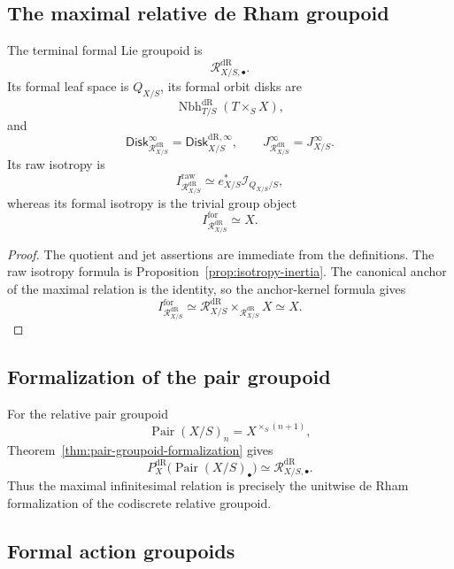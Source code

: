 \subsection{The maximal relative de Rham groupoid}

\begin{example}
The terminal formal Lie groupoid is
\[
    \mathcal R^{\mathrm{dR}}_{X/S,\bullet}.
\]
Its formal leaf space is $Q_{X/S}$, its formal orbit disks are
\[
    \operatorname{Nbh}^{\mathrm{dR}}_{T/S}(T\times_SX),
\]
and
\[
    \mathsf{Disk}^{\infty}_{\mathcal R^{\mathrm{dR}}_{X/S}}=\mathsf{Disk}^{\mathrm{dR},\infty}_{X/S},
    \qquad
    J^\infty_{\mathcal R^{\mathrm{dR}}_{X/S}}=J^\infty_{X/S}.
\]
Its raw isotropy is
\[
    I^{\mathrm{raw}}_{\mathcal R^{\mathrm{dR}}_{X/S}}
    \simeq
    e_{X/S}^*\mathcal I_{Q_{X/S}/S},
\]
whereas its formal isotropy is the trivial group object
\[
    I^{\mathrm{for}}_{\mathcal R^{\mathrm{dR}}_{X/S}}
    \simeq X.
\]
\end{example}

\begin{proof}
The quotient and jet assertions are immediate from the definitions.  The raw
isotropy formula is
Proposition~\ref{prop:isotropy-inertia}.  The canonical anchor of the maximal
relation is the identity, so the anchor-kernel formula gives
\[
    I^{\mathrm{for}}_{\mathcal R^{\mathrm{dR}}_{X/S}}
    \simeq
    \mathcal R^{\mathrm{dR}}_{X/S}\times_{\mathcal R^{\mathrm{dR}}_{X/S}}X
    \simeq X.
\]
\end{proof}

\subsection{Formalization of the pair groupoid}

\begin{example}
For the relative pair groupoid
\[
    \operatorname{Pair}(X/S)_n
    =
    X^{\times_S(n+1)},
\]
Theorem~\ref{thm:pair-groupoid-formalization} gives
\[
    P_X^{\mathrm{dR}}\bigl(\operatorname{Pair}(X/S)_\bullet\bigr)
    \simeq
    \mathcal R^{\mathrm{dR}}_{X/S,\bullet}.
\]
Thus the maximal infinitesimal relation is precisely the unitwise
de Rham formalization of the codiscrete relative groupoid.
\end{example}

\subsection{Formal action groupoids}

